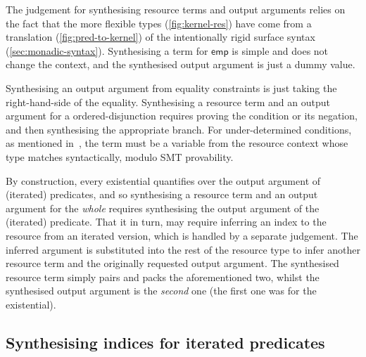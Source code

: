 The judgement for synthesising resource terms and output arguments relies on
the fact that the more flexible  types (\cref{fig:kernel-res})
have come from a translation (\cref{fig:pred-to-kernel}) of the intentionally
rigid surface syntax (\cref{sec:monadic-syntax}). Synthesising a term for
$\mathsf{emp}$ is simple and does not change the context, and the synthesised
output argument is just a dummy value.

Synthesising an output argument from equality constraints is just taking the right-hand-side of the
equality. Synthesising a resource term and an output argument for a
ordered-disjunction requires proving the condition or its negation, and then
synthesising the appropriate branch. For under-determined conditions, as
mentioned in~, the term must be a variable
from the resource context whose type matches syntactically, modulo SMT
provability.

By construction, every existential quantifies over the output argument of
(iterated) predicates, and so synthesising a resource term and an output
argument for the \emph{whole} requires synthesising the output argument of the
(iterated) predicate. That it in turn, may require inferring an index to the
resource from an iterated version, which is handled by a separate judgement.
The inferred argument is substituted into the rest of the resource type to
infer another resource term and the originally requested output argument. The
synthesised resource term simply pairs and packs the aforementioned two, whilst
the synthesised output argument is the \emph{second} one (the first one was for
the existential).

\subsection{Synthesising indices for iterated predicates}\label{subsec:synth-indices}


